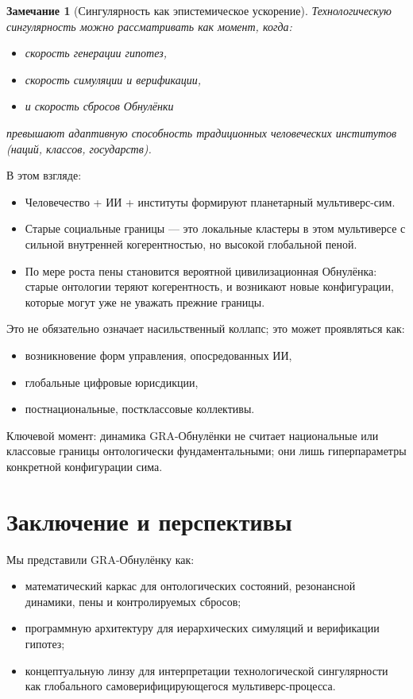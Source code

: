 \documentclass[11pt,a4paper]{article}
\newtheorem{remark}{Замечание}
\begin{document}
\begin{remark}[Сингулярность как эпистемическое ускорение]
Технологическую сингулярность можно рассматривать как момент, когда:
\begin{itemize}
  \item скорость генерации гипотез,
  \item скорость симуляции и верификации,
  \item и скорость сбросов Обнулёнки
\end{itemize}
превышают адаптивную способность традиционных человеческих институтов
(наций, классов, государств).
\end{remark}

В этом взгляде:
\begin{itemize}
  \item Человечество + ИИ + институты формируют
        планетарный мультиверс-сим.
  \item Старые социальные границы --- это локальные кластеры
        в этом мультиверсе с сильной внутренней когерентностью,
        но высокой глобальной пеной.
  \item По мере роста пены становится вероятной
        цивилизационная Обнулёнка:
        старые онтологии теряют когерентность,
        и возникают новые конфигурации,
        которые могут уже не уважать прежние границы.
\end{itemize}

Это не обязательно означает насильственный коллапс;
это может проявляться как:
\begin{itemize}
  \item возникновение форм управления, опосредованных ИИ,
  \item глобальные цифровые юрисдикции,
  \item постнациональные, постклассовые коллективы.
\end{itemize}
Ключевой момент: динамика GRA-Обнулёнки
не считает национальные или классовые границы
онтологически фундаментальными;
они лишь гиперпараметры конкретной конфигурации сима.

\section{Заключение и перспективы}
Мы представили GRA-Обнулёнку как:
\begin{itemize}
  \item математический каркас для онтологических состояний,
        резонансной динамики, пены и контролируемых сбросов;
  \item программную архитектуру для иерархических симуляций
        и верификации гипотез;
  \item концептуальную линзу для интерпретации
        технологической сингулярности
        как глобального самоверифицирующегося мультиверс-процесса.
\end{itemize}
\end{document}
